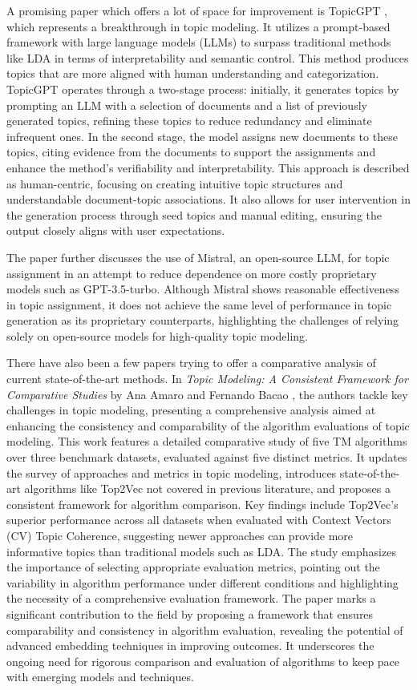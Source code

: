 \documentclass[fleqn,moreauthors,10pt]{ds_report}
\begin{document}
A promising paper which offers a lot of space for improvement is TopicGPT \cite{pham2023topicgpt}, which represents a breakthrough in topic modeling. It utilizes a prompt-based framework with large language models (LLMs) to surpass traditional methods like LDA in terms of interpretability and semantic control. This method produces topics that are more aligned with human understanding and categorization. TopicGPT operates through a two-stage process: initially, it generates topics by prompting an LLM with a selection of documents and a list of previously generated topics, refining these topics to reduce redundancy and eliminate infrequent ones. In the second stage, the model assigns new documents to these topics, citing evidence from the documents to support the assignments and enhance the method's verifiability and interpretability. This approach is described as human-centric, focusing on creating intuitive topic structures and understandable document-topic associations. It also allows for user intervention in the generation process through seed topics and manual editing, ensuring the output closely aligns with user expectations. 

The paper further discusses the use of Mistral, an open-source LLM, for topic assignment in an attempt to reduce dependence on more costly proprietary models such as GPT-3.5-turbo. Although Mistral shows reasonable effectiveness in topic assignment, it does not achieve the same level of performance in topic generation as its proprietary counterparts, highlighting the challenges of relying solely on open-source models for high-quality topic modeling. 

There have also been a few papers trying to offer a comparative analysis of current state-of-the-art methods. In \textit{Topic Modeling: A Consistent Framework for Comparative Studies} by Ana Amaro and Fernando Bacao \cite{Amaro2024TopicMA}, the authors tackle key challenges in topic modeling, presenting a comprehensive analysis aimed at enhancing the consistency and comparability of the algorithm evaluations of topic modeling. This work features a detailed comparative study of five TM algorithms over three benchmark datasets, evaluated against five distinct metrics. It updates the survey of approaches and metrics in topic modeling, introduces state-of-the-art algorithms like Top2Vec not covered in previous literature, and proposes a consistent framework for algorithm comparison.
Key findings include Top2Vec's superior performance across all datasets when evaluated with Context Vectors (CV) Topic Coherence, suggesting newer approaches can provide more informative topics than traditional models such as LDA. The study emphasizes the importance of selecting appropriate evaluation metrics, pointing out the variability in algorithm performance under different conditions and highlighting the necessity of a comprehensive evaluation framework.
The paper marks a significant contribution to the field by proposing a framework that ensures comparability and consistency in algorithm evaluation, revealing the potential of advanced embedding techniques in improving outcomes. It underscores the ongoing need for rigorous comparison and evaluation of algorithms to keep pace with emerging models and techniques.
\end{document}
